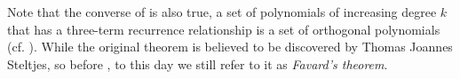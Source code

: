 Note that the converse of  is also true, a set of polynomials of increasing degree $k$ that has a three-term recurrence relationship is a set of orthogonal polynomials (cf. ).
While the original theorem is believed to be discovered by Thomas Joannes Steltjes, so before \cite{1935-favard}, to this day we still refer to it as \textit{Favard's theorem}.

